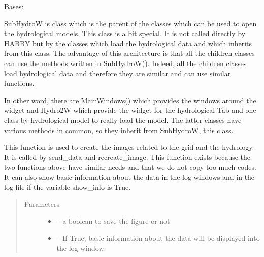 \documentclass[letterpaper,10pt,english]{sphinxmanual}
\begin{document}
\begin{fulllineitems}
\label{\detokenize{index:src_GUI.hydro_GUI_2.SubHydroW}}
Bases: 

SubHydroW is class which is the parent of the classes which can be used to open the hydrological models. This class
is a bit special. It is not called directly by HABBY but by the classes which load the hydrological data and which
inherits from this class. The advantage of this architecture is that all the children classes can use the methods
written in SubHydroW(). Indeed, all the children classes load hydrological data and therefore they are similar and
can use similar functions.

In other word, there are MainWindows() which provides the windows around the widget and Hydro2W which provide the
widget for the hydrological Tab and one class by hydrological model to really load the model. The latter classes
have various methods in common, so they inherit from SubHydroW, this class.

\begin{fulllineitems}
\label{\detokenize{index:src_GUI.hydro_GUI_2.SubHydroW.create_image}}
This function is used to create the images related to the grid and the hydrology. It is called by send\_data
and recreate\_image. This function exists because the two functions above have similar needs and that we do not
copy too much codes. It can also show basic information about the data in the log windows and in the log file
if the variable show\_info is True.
\begin{quote}\begin{description}
\item[{Parameters}] \leavevmode\begin{itemize}
\item {} 
 -- a boolean to save the figure or not

\item {} 
 -- If True, basic information about the data will be displayed into the log window.

\end{itemize}


\end{description}
\end{quote}
\end{fulllineitems}
\end{fulllineitems}
\end{document}
